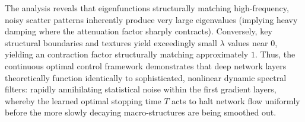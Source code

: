 The analysis reveals that eigenfunctions structurally matching high-frequency, noisy scatter patterns inherently produce very large eigenvalues (implying heavy damping where the attenuation factor sharply contracts). Conversely, key structural boundaries and textures yield exceedingly small $\lambda$ values near $0$, yielding an contraction factor structurally matching approximately $1$. Thus, the continuous optimal control framework demonstrates that deep network layers theoretically function identically to sophisticated, nonlinear dynamic spectral filters: rapidly annihilating statistical noise within the first gradient layers, whereby the learned optimal stopping time $T$ acts to halt network flow uniformly before the more slowly decaying macro-structures are being smoothed out.
